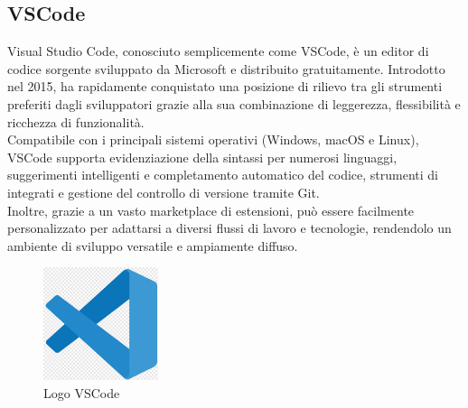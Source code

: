 \subsection{VSCode}
\noindent Visual Studio Code, conosciuto semplicemente come VSCode, è un editor di codice sorgente sviluppato da Microsoft e distribuito gratuitamente. Introdotto nel 2015, ha rapidamente conquistato una posizione di rilievo tra gli strumenti preferiti dagli sviluppatori grazie alla sua combinazione di leggerezza, flessibilità e ricchezza di funzionalità. \\Compatibile con i principali sistemi operativi (Windows, macOS e Linux), VSCode supporta evidenziazione della sintassi per numerosi linguaggi, suggerimenti intelligenti e completamento automatico del codice, strumenti di  integrati e gestione del controllo di versione tramite Git. \\Inoltre, grazie a un vasto marketplace di estensioni, può essere facilmente personalizzato per adattarsi a diversi flussi di lavoro e tecnologie, rendendolo un ambiente di sviluppo versatile e ampiamente diffuso.
\begin{figure}[H]
    \centering
    \includegraphics[width=0.3\textwidth]{img/vscode.png}
    \caption[Logo VSCode]{Logo VSCode}
\end{figure}

\newpage